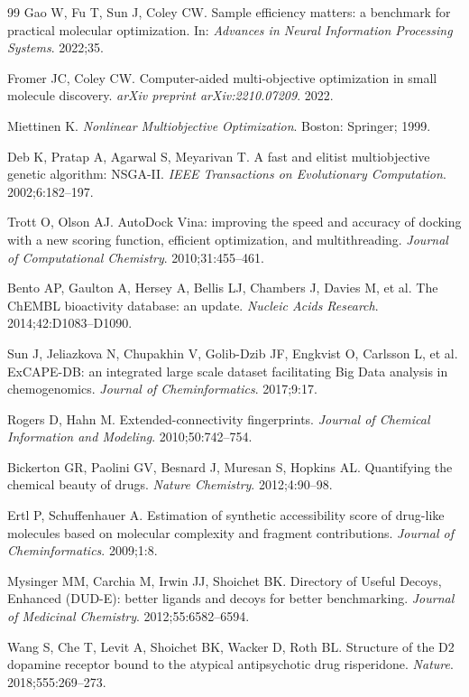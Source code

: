 \documentclass[referee,lineno,pdflatex,sn-basic]{sn-jnl}
\theoremstyle{thmstyleone}%
\theoremstyle{thmstyletwo}%
\theoremstyle{thmstylethree}%
\begin{document}
\begin{thebibliography}{99}
Gao W, Fu T, Sun J, Coley CW.
Sample efficiency matters: a benchmark for practical molecular optimization.
In: \textit{Advances in Neural Information Processing Systems}. 2022;35.

Fromer JC, Coley CW.
Computer-aided multi-objective optimization in small molecule discovery.
\textit{arXiv preprint arXiv:2210.07209}. 2022.

Miettinen K.
\textit{Nonlinear Multiobjective Optimization}.
Boston: Springer; 1999.

Deb K, Pratap A, Agarwal S, Meyarivan T.
A fast and elitist multiobjective genetic algorithm: NSGA-II.
\textit{IEEE Transactions on Evolutionary Computation}. 2002;6:182--197.

Trott O, Olson AJ.
AutoDock Vina: improving the speed and accuracy of docking with a new scoring function, efficient optimization, and multithreading.
\textit{Journal of Computational Chemistry}. 2010;31:455--461.

Bento AP, Gaulton A, Hersey A, Bellis LJ, Chambers J, Davies M, et al.
The ChEMBL bioactivity database: an update.
\textit{Nucleic Acids Research}. 2014;42:D1083--D1090.

Sun J, Jeliazkova N, Chupakhin V, Golib-Dzib JF, Engkvist O, Carlsson L, et al.
ExCAPE-DB: an integrated large scale dataset facilitating Big Data analysis in chemogenomics.
\textit{Journal of Cheminformatics}. 2017;9:17.

Rogers D, Hahn M.
Extended-connectivity fingerprints.
\textit{Journal of Chemical Information and Modeling}. 2010;50:742--754.

Bickerton GR, Paolini GV, Besnard J, Muresan S, Hopkins AL.
Quantifying the chemical beauty of drugs.
\textit{Nature Chemistry}. 2012;4:90--98.

Ertl P, Schuffenhauer A.
Estimation of synthetic accessibility score of drug-like molecules based on molecular complexity and fragment contributions.
\textit{Journal of Cheminformatics}. 2009;1:8.

Mysinger MM, Carchia M, Irwin JJ, Shoichet BK.
Directory of Useful Decoys, Enhanced (DUD-E): better ligands and decoys for better benchmarking.
\textit{Journal of Medicinal Chemistry}. 2012;55:6582--6594.

Wang S, Che T, Levit A, Shoichet BK, Wacker D, Roth BL.
Structure of the D2 dopamine receptor bound to the atypical antipsychotic drug risperidone.
\textit{Nature}. 2018;555:269--273.


\end{thebibliography}
\end{document}
